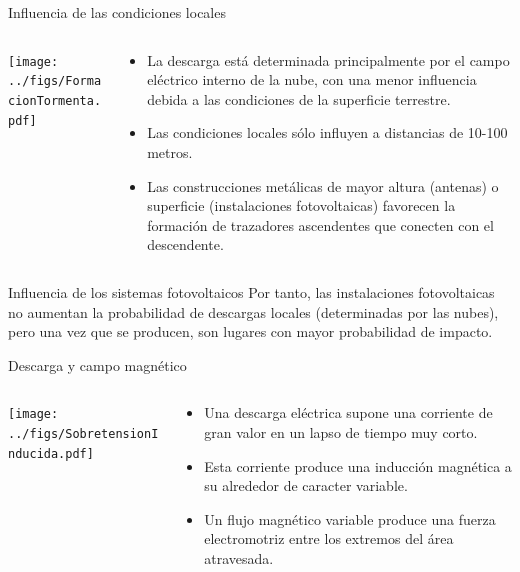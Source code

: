 \documentclass[aspectratio=169, usenames,svgnames,dvipsnames]{beamer}
\begin{document}
\begin{frame}[label={sec:org1ff0a47}]{Influencia de las condiciones locales}
\begin{columns}
\begin{column}{0.5\columnwidth}
\begin{center}
\texttt{[image: ../figs/FormacionTormenta.pdf]}
\end{center}
\end{column}

\begin{column}{0.5\columnwidth}
\begin{itemize}
\item \alert{La descarga está determinada principalmente por el campo eléctrico
interno de la nube}, con una menor influencia debida a las
condiciones de la superficie terrestre.

\item Las \alert{condiciones locales sólo influyen} a distancias de 10-100 metros.

\item Las \alert{construcciones metálicas de mayor altura} (antenas) o superficie
(instalaciones fotovoltaicas) favorecen la formación de trazadores
ascendentes que conecten con el descendente.
\end{itemize}
\end{column}
\end{columns}
\end{frame}

\begin{frame}[label={sec:org0c19d7c}]{Influencia de los sistemas fotovoltaicos}
Por tanto, \alert{las instalaciones fotovoltaicas no aumentan la probabilidad
de descargas locales} (determinadas por las nubes), pero una vez que se
producen, son lugares con mayor probabilidad de impacto.
\end{frame}

\begin{frame}[label={sec:org8c1de31},plain]{Descarga y campo magnético}
\begin{columns}
\begin{column}{0.4\columnwidth}
\begin{center}
\texttt{[image: ../figs/SobretensionInducida.pdf]}
\end{center}
\end{column}
\begin{column}{0.6\columnwidth}
\begin{itemize}
\item Una descarga eléctrica supone una \alert{corriente de gran valor} en un lapso de \alert{tiempo muy corto}.

\item Esta corriente produce una \alert{inducción magnética} a su alrededor de caracter \alert{variable}.

\item Un flujo magnético variable produce una \alert{fuerza electromotriz} entre los extremos del área atravesada.
\end{itemize}
\end{column}
\end{columns}
\end{frame}
\end{document}
